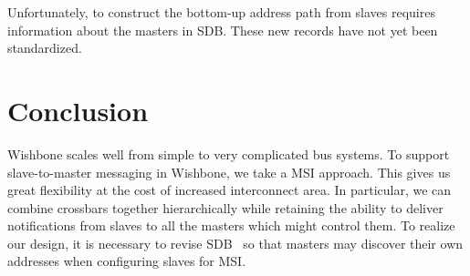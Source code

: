 \documentclass[a4paper]{jacow}
\begin{document}
Unfortunately,
to construct the bottom-up address path from slaves requires information
about the masters in SDB.
These new records have not yet been standardized.

\section{Conclusion}

Wishbone scales well from simple to very complicated bus systems.
To support slave-to-master messaging in Wishbone, we take a MSI approach.
This gives us great flexibility at the cost of increased interconnect area.
In particular, we can combine crossbars together hierarchically 
while retaining the ability to 
deliver notifications from slaves to all the masters which might control them.
To realize our design,
it is necessary to revise SDB~\cite{sdb} so that masters may
discover their own addresses when configuring slaves for MSI.



\end{document}

